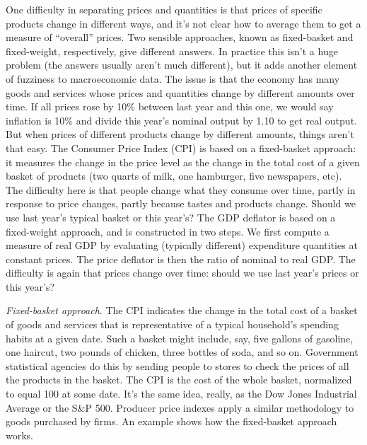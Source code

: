 \documentclass[12pt,letterpaper]{article}
\begin{document}

One difficulty in separating prices and quantities
is that prices of specific
products change in different ways, and it's not clear how to
average them to get a measure of ``overall'' prices. Two sensible
approaches, known as fixed-basket and fixed-weight, respectively,
give different answers. In practice this isn't a huge problem (the
answers usually aren't much different), but it adds another
element of fuzziness to macroeconomic data. The issue is that the
economy has many goods and services whose prices and quantities
change by different amounts over time. If all prices rose by 10\%
between last year and this one, we would say inflation is 10\% and
divide this year's nominal output by 1.10 to get real output. But
when prices of different products change by different amounts,
things aren't that easy. The Consumer Price Index (CPI) is
based on a fixed-basket approach: it measures the change in the
price level as the change in the total cost of a given basket of
products (two quarts of milk, one hamburger, five newspapers,
etc). The difficulty here is that people change what they consume
over time, partly in response to price changes, partly because
tastes and products change. Should we use last year's typical
basket or this year's? The GDP deflator is based on a
fixed-weight approach, and is constructed in two steps. We first
compute a measure of real GDP by evaluating (typically
different) expenditure quantities at constant prices. The price
deflator is then the ratio of nominal to real GDP. The
difficulty is again that prices change over time: should we use
last year's prices or this year's?

{\it Fixed-basket approach\/}. The CPI indicates the change in
the total cost of a basket of goods and services that is
representative of a typical household's spending habits at a given
date. Such a basket might include, say, five gallons of gasoline,
one haircut, two pounds of chicken, three bottles of soda, and so
on. Government statistical agencies do this by sending people to
stores to check the prices of all the products in the basket. The
CPI is the cost of the whole basket, normalized to equal 100 at
some date. It's the same idea, really, as the Dow Jones Industrial
Average or the S\&P 500. Producer price indexes apply a similar
methodology to goods purchased by firms.  An example shows how the
fixed-basket approach works.
\end{document}
